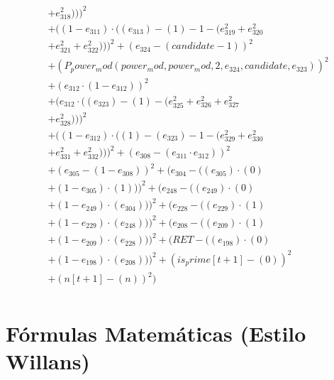 \documentclass[10pt, a4paper]{article}
\begin{document}
\begin{small}
\begin{align*}
& + e_{318}^{2})))^{2} \\
& + ((1 - e_{311})  \cdot  ((e_{313}) - (1) - 1 - (e_{319}^{2} + e_{320}^{2} \\
& + e_{321}^{2} + e_{322}^{2})))^{2} + (e_{324} - (candidate - 1))^{2} \\
& + (P_power_mod(power_mod, power_mod, 2, e_{324}, candidate, e_{323}))^{2} \\
& + (e_{312}  \cdot  (1 - e_{312}))^{2} \\
& + (e_{312}  \cdot  ((e_{323}) - (1) - (e_{325}^{2} + e_{326}^{2} + e_{327}^{2} \\
& + e_{328}^{2})))^{2} \\
& + ((1 - e_{312})  \cdot  ((1) - (e_{323}) - 1 - (e_{329}^{2} + e_{330}^{2} \\
& + e_{331}^{2} + e_{332}^{2})))^{2} + (e_{308} - (e_{311}  \cdot  e_{312}))^{2} \\
& + (e_{305} - (1 - e_{308}))^{2} + (e_{304} - ((e_{305})  \cdot  (0) \\
& + (1 - e_{305})  \cdot  (1)))^{2} + (e_{248} - ((e_{249})  \cdot  (0) \\
& + (1 - e_{249})  \cdot  (e_{304})))^{2} + (e_{228} - ((e_{229})  \cdot  (1) \\
& + (1 - e_{229})  \cdot  (e_{248})))^{2} + (e_{208} - ((e_{209})  \cdot  (1) \\
& + (1 - e_{209})  \cdot  (e_{228})))^{2} + (RET - ((e_{198})  \cdot  (0) \\
& + (1 - e_{198})  \cdot  (e_{208})))^{2} + (is_prime[t+1] - (0))^{2} \\
& + (n[t+1] - (n))^{2}) \\
\end{align*}
\end{small}\part{Fórmulas Matemáticas (Estilo Willans)}
\end{document}
